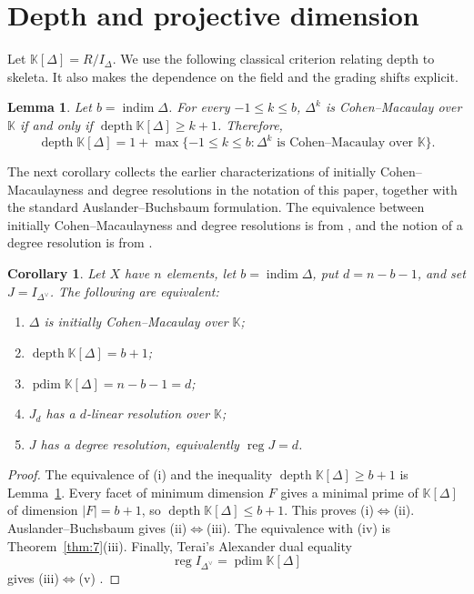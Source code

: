 \documentclass[11pt]{amsart}
\newcommand{\K}{\mathbb K}
\DeclareMathOperator{\indim}{indim}
\DeclareMathOperator{\depth}{depth}
\DeclareMathOperator{\pdim}{pdim}
\DeclareMathOperator{\reg}{reg}
\newtheorem{lemma}[theorem]{Lemma}
\newtheorem{corollary}[theorem]{Corollary}
\theoremstyle{definition}
\begin{document}
	\section{Depth and projective dimension}\label{sec:7}
	
	Let $\K[\Delta]=R/I_\Delta$.  We use the following classical criterion relating depth to skeleta. It also makes the dependence on the field and the grading shifts explicit.
	
	\begin{lemma}\cite{HerzogSoleymanJahanZheng2010}\label{lem:depth}
		Let $b=\indim\Delta$.  For every $-1\leq k\leq b$, $\Delta^k$ is Cohen--Macaulay over $\K$ if and only if $\depth\K[\Delta]\geq k+1$. Therefore,
		\[
		\depth\K[\Delta]
		=1+\max\{-1\leq k\leq b:\Delta^k
		\text{ is Cohen--Macaulay over }\K\}.
		\]
	\end{lemma}
	
	The next corollary collects the earlier characterizations of initially Cohen--Macaulayness and degree resolutions in the notation of this paper, together with the standard Auslander--Buchsbaum formulation. The equivalence between initially Cohen--Macaulayness and degree resolutions is from \cite{Namiq2026ICM}, and the notion of a degree resolution is from \cite{Namiq2026Skeletons}.
	
	\begin{corollary}\label{cor:12}
		Let $X$ have $n$ elements, let $b=\indim\Delta$, put $d=n-b-1$, and set $J=I_{\Delta^{\vee}}$.  The following are equivalent:
		\begin{enumerate}[label=\textup{(\roman*)}]
			\item $\Delta$ is initially Cohen--Macaulay over $\K$;
			\item $\depth\K[\Delta]=b+1$;
			\item $\pdim\K[\Delta]=n-b-1=d$;
			\item $J_d$ has a $d$-linear resolution over $\K$;
			\item $J$ has a degree resolution, equivalently $\reg J=d$.
		\end{enumerate}
	\end{corollary}
	
	\begin{proof}
		The equivalence of (i) and the inequality $\depth\K[\Delta]\geq b+1$ is Lemma~\ref{lem:depth}.  Every facet of minimum dimension $F$ gives a minimal prime of $\K[\Delta]$ of dimension $|F|=b+1$, so $\depth\K[\Delta]\leq b+1$.  This proves (i)$\Longleftrightarrow$(ii). Auslander--Buchsbaum gives (ii)$\Longleftrightarrow$(iii).  The equivalence with (iv) is Theorem~\ref{thm:7}(iii).  Finally, Terai's Alexander dual equality
		\[
		\reg I_{\Delta^{\vee}}=\pdim\K[\Delta]
		\]
		gives (iii)$\Longleftrightarrow$(v) \cite{Terai1999}.
	\end{proof}
	
\end{document}
